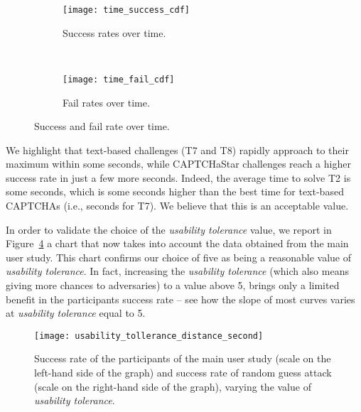 \documentclass[conference]{IEEEtran}
\newcommand{\hilight}[1]{#1}
\begin{document}
\begin{comment}
\begin{figure}[h!]
\begin{subfigure}{.22\textwidth}
\texttt{[image: time\_success\_cdf2]}
\caption{Success rates over time.}
\label{fig:cdf_time_success}
\end{subfigure}
\hspace{0.1cm}
\begin{subfigure}{.22\textwidth}
\texttt{[image: time\_fail\_cdf2]}
\caption{Fail rates over time.}
\label{fig:cdf_time_fail}
\end{subfigure}
\vspace{-0.25cm}
\caption{Success and fail rate over time. }
\label{fig:time_cdf}
\end{figure}
\end{comment}
\begin{figure}[t!]
\centering
\begin{subfigure}{.48\textwidth}
\texttt{[image: time\_success\_cdf]}
\caption{Success rates over time.}
\label{fig:cdf_time_success}
\end{subfigure}
\\
\vspace{0.5cm}
\begin{subfigure}{.48\textwidth}
\texttt{[image: time\_fail\_cdf]}
\caption{Fail rates over time.}
\label{fig:cdf_time_fail}
\end{subfigure}
\caption{Success and fail rate over time. }
\label{fig:time_cdf}
\end{figure}
We highlight that text-based challenges (T7 and T8) rapidly approach to their maximum within some  seconds, while CAPTCHaStar challenges reach a higher success rate in just a few more seconds. 
Indeed, the average time to solve T2 is some  seconds, which is some  seconds higher than the best time for text-based CAPTCHAs (i.e.,  seconds for T7).
We believe that this is an acceptable value.

In order to validate the choice of the \textit{usability tolerance} value, we report in Figure~\ref{fig:usability_tollerance_second} \hilight{a chart that now takes into account the data obtained from the main user study.}
This chart confirms our choice of five as being a reasonable value of \textit{usability tolerance}.
In fact, increasing the \textit{usability tolerance} (which also means giving more chances to adversaries) to a value above 5, brings only a limited benefit in the participants success rate -- see how the slope of most curves varies at \textit{usability tolerance} equal to 5.
\begin{figure}[ht]
\centering
\texttt{[image: usability\_tollerance\_distance\_second]}\caption{Success rate of the participants of the main user study (scale on the left-hand side of the graph) and success rate of random guess attack (scale on the right-hand side of the graph), varying the value of \textit{usability tolerance}.}
\label{fig:usability_tollerance_second}
\end{figure}
\end{document}
